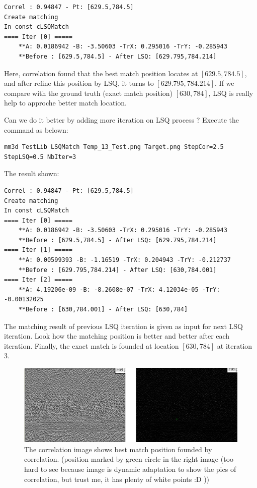 \documentclass[twoside]{article}
\begin{document}
\begin{verbatim}
Correl : 0.94847 - Pt: [629.5,784.5]
Create matching
In const cLSQMatch
==== Iter [0] =====
    **A: 0.0186942 -B: -3.50603 -TrX: 0.295016 -TrY: -0.285943
    **Before : [629.5,784.5] - After LSQ: [629.795,784.214]
\end{verbatim}

Here, correlation found that the best match position locates at $[629.5,784.5]$, and after refine this position by LSQ, it turns to $[629.795,784.214]$. If we compare with the ground truth (exact match position) $[630,784]$, LSQ is really help to approche better match location.

Can we do it better by adding more iteration on LSQ process ? Execute the command as belown:
\begin{verbatim}
mm3d TestLib LSQMatch Temp_13_Test.png Target.png StepCor=2.5 StepLSQ=0.5 NbIter=3
\end{verbatim}

The result shown:
\begin{verbatim}
Correl : 0.94847 - Pt: [629.5,784.5]
Create matching
In const cLSQMatch
==== Iter [0] =====
    **A: 0.0186942 -B: -3.50603 -TrX: 0.295016 -TrY: -0.285943
    **Before : [629.5,784.5] - After LSQ: [629.795,784.214]
==== Iter [1] =====
    **A: 0.00599393 -B: -1.16519 -TrX: 0.204943 -TrY: -0.212737
    **Before : [629.795,784.214] - After LSQ: [630,784.001]
==== Iter [2] =====
    **A: 4.19206e-09 -B: -8.2608e-07 -TrX: 4.12034e-05 -TrY: -0.00132025
    **Before : [630,784.001] - After LSQ: [630,784]
\end{verbatim}

The matching result of previous LSQ iteration is given as input for next LSQ iteration. Look how the matching position is better and better after each iteration. Finally, the exact match is founded at location $[630,784]$ at iteration 3.

\begin{figure}[h] 
\centering
\includegraphics[width=12cm]{Correlation_img.png}
\caption{The correlation image shows best match position founded by correlation. (position marked by green circle in the right image (too hard to see because image is dynamic adaptation to show the pics of correlation, but trust me, it has plenty of white points :D ))}
\label{fig:1.2}
\end{figure}
\end{document}
